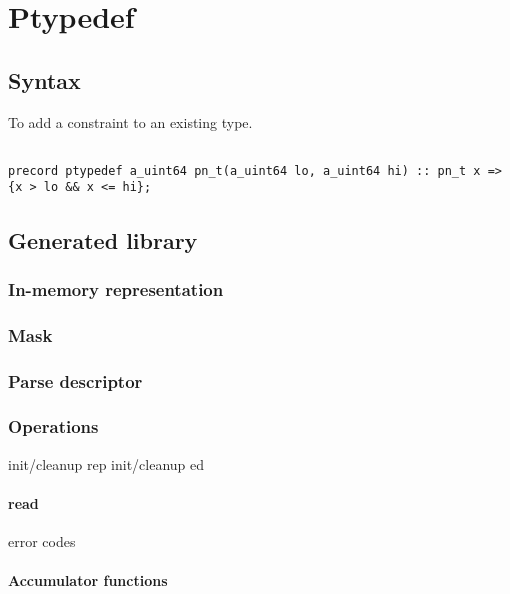 \chapter{Ptypedef}
\label{chap:typedef}
\section{Syntax}
To add a constraint to an existing type.
\begin{verbatim}

precord ptypedef a_uint64 pn_t(a_uint64 lo, a_uint64 hi) :: pn_t x => {x > lo && x <= hi};

\end{verbatim}


\section{Generated library}
\subsection{In-memory representation}
\label{sec:typedefs-rep}
\subsection{Mask}
\label{sec:typedefs-masks}
\subsection{Parse descriptor}
\label{sec:typedefs-parse-descriptors}
\subsection{Operations}
init/cleanup rep
init/cleanup ed
\subsubsection{read}
  error codes
\subsubsection{Accumulator functions}

